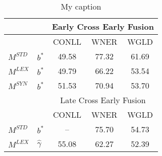 \begin{table}[]
\begin{tabular}{@{}llccc@{}}
                  &     &          \multicolumn{3}{c}{Early Cross Early Fusion} \\ \midrule
          &                      & CONLL                                                                    & WNER        & WGLD       \\ \cmidrule{3-5}
$M^{STD}$ & $b^*$                & 49.58                                                                    & 77.32       & 61.69      \\
$M^{LEX}$ & $b^*$                & 49.79                                                                    & 66.22       & 53.54      \\
$M^{SYN}$ & $b^*$                & 51.53                                                                    & 70.94       & 53.70      \\ \midrule
          &                      & \multicolumn{3}{c}{Late Cross Early Fusion}	\\ \midrule
          &                      & CONLL                                                                    & WNER        & WGLD       \\ \cmidrule{3-5}
$M^{STD}$ & $b^*$                & --                                                                       & 75.70       & 54.73      \\
$M^{LEX}$ & $\hat{\gamma}$& 55.08                                                                    & 62.27       & 52.39      \\ \bottomrule
\end{tabular}
\caption{My caption}
\label{my-label}
\end{table}

